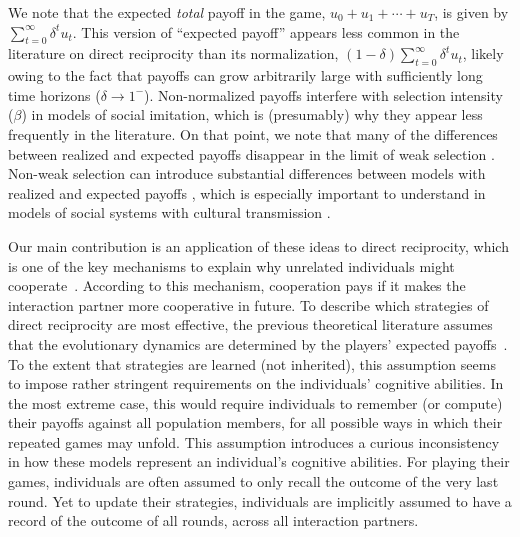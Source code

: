 \documentclass[11pt]{article}
\theoremstyle{plainCl1}
\theoremstyle{plainCl2}
\begin{document}
We note that the expected \emph{total} payoff in the game, $u_{0}+u_{1}+\cdots +u_{T}$, is given by $\sum_{t=0}^{\infty}\delta^{t}u_{t}$. This version of ``expected payoff'' appears less common in the literature on direct reciprocity than its normalization, $\left(1-\delta\right)\sum_{t=0}^{\infty}\delta^{t}u_{t}$, likely owing to the fact that payoffs can grow arbitrarily large with sufficiently long time horizons ($\delta\rightarrow 1^{-}$). Non-normalized payoffs interfere with selection intensity ($\beta$) in models of social imitation, which is (presumably) why they appear less frequently in the literature. On that point, we note that many of the differences between realized and expected payoffs disappear in the limit of weak selection \citep{mcavoy:NHB:2020}. Non-weak selection can introduce substantial differences between models with realized and expected payoffs \citep{mcavoy:PLOSCB:2021}, which is especially important to understand in models of social systems with cultural transmission \citep{cavalli1981cultural}.

Our main contribution is an application of these ideas to direct reciprocity, which is one of the key mechanisms to explain why unrelated individuals might cooperate~\citep{nowak:Science:2006}. 
According to this mechanism, cooperation pays if it makes the interaction partner more cooperative in future. 
To describe which strategies of direct reciprocity are most effective, the previous theoretical literature assumes that the evolutionary dynamics are determined by the players' expected payoffs~\citep{brauchli:JTB:1999,brandt:JTB:2006,ohtsuki:JTB:2007b,szolnoki:pre:2009b,imhof2010stochastic,van-segbroeck:prl:2012,grujic:jtb:2012,Martinez2012,stewart:pnas:2013,pinheiro:PLoSCB:2014,stewart:games:2015,Baek2016,McAvoy:ProcA:2019,glynatsi:SCR:2020,Schmid:PlosCB:2022,Murase:SciRep:2022}.
To the extent that strategies are learned (not inherited), this assumption seems to impose rather stringent requirements on the individuals' cognitive abilities. 
In the most extreme case, this would require individuals to remember (or compute) their payoffs against all population members, for all possible ways in which their repeated games may unfold. 
This assumption introduces a curious inconsistency in how these models represent an individual's cognitive abilities. 
For playing their games, individuals are often assumed to only recall the outcome of the very last round. 
Yet to update their strategies, individuals are implicitly assumed to have a record of the outcome of all rounds, across all interaction partners. 
\end{document}
